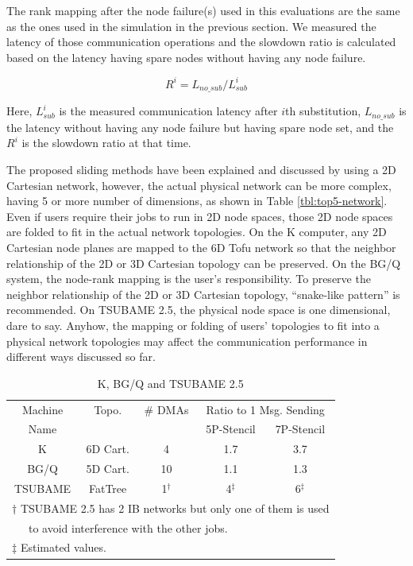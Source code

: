 \documentclass[Afour,times,sageh]{sagej}
\begin{document}
The rank mapping after the node
failure(s) used in this evaluations are the same as the ones used in
the simulation in the previous section.
We measured the latency of those communication operations and the
slowdown ratio is calculated based on the latency having spare
nodes without having any node failure.

\[
R^i = L_{no\_sub} / L_{sub}^i
\]

Here, $L_{sub}^i$ is the measured communication latency after
$i$th substitution, $L_{no\_sub}$ is the latency without having any
node failure but having spare node set, and the $R^i$ is the
slowdown ratio at that time.

The proposed sliding methods have been explained and discussed by
using a 2D Cartesian network, however, the actual physical network can
be more complex, having 5 or more number of dimensions, as shown in
Table \ref{tbl:top5-network}. Even if users
require their jobs to run in 2D node spaces, those 2D node spaces
are folded to fit in the actual network topologies. On the K computer,
any 2D Cartesian node planes are mapped to the 6D Tofu network so that
the neighbor relationship of the 2D or 3D Cartesian topology can be
preserved. On the BG/Q system, the node-rank mapping is the user's
responsibility. To preserve the neighbor relationship of the 2D or 3D
Cartesian topology, ``snake-like pattern'' is
recommended\citep{BGQ-softdev}. On TSUBAME 2.5, the physical node
space is one dimensional, dare to say. Anyhow, the
mapping or folding of users' topologies to fit into a physical network
topologies may affect the communication performance in different ways
discussed so far.

\begin{table}[htb]
\centering
\caption{K, BG/Q and TSUBAME 2.5}
\label{tbl:machines}
{\small
\begin{tabular}{c|c|c|c|c}
\hline
Machine & Topo. & \# DMAs &\multicolumn{2}{c}{Ratio to 1 Msg. Sending}\\
Name & &  & 5P-Stencil & 7P-Stencil \\
\hline
K & 6D Cart. & 4 & 1.7 & 3.7 \\
BG/Q\citep{Chen:2011:IBG:2063384.2063419} & 5D Cart. & 10 & 1.1 & 1.3 \\
TSUBAME & FatTree & 1$^{\dagger}$ & 4$^{\ddagger}$ & 6$^{\ddagger}$ \\
\hline
\multicolumn{5}{l}{\footnotesize $\dagger$ TSUBAME 2.5 has 2 IB
  networks but only one of them is used} \\
\multicolumn{5}{l}{\footnotesize ~~~to avoid
  interference with the other jobs.} \\
\multicolumn{5}{l}{\footnotesize $\ddagger$ Estimated values.} \\
\end{tabular}
}
\end{table}
\end{document}

